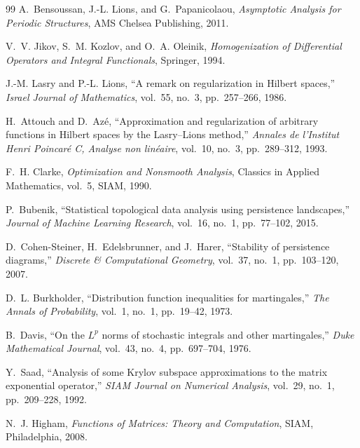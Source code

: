 \documentclass[11pt,a4paper,reqno]{article}
\theoremstyle{definition}
\theoremstyle{remark}
\begin{document}
\begin{thebibliography}{99}
A.~Bensoussan, J.-L. Lions, and G.~Papanicolaou,
\emph{Asymptotic Analysis for Periodic Structures},
AMS Chelsea Publishing, 2011.

V.~V. Jikov, S.~M. Kozlov, and O.~A. Oleinik,
\emph{Homogenization of Differential Operators and Integral Functionals},
Springer, 1994.

J.-M. Lasry and P.-L. Lions,
``A remark on regularization in Hilbert spaces,''
\emph{Israel Journal of Mathematics}, vol.~55, no.~3, pp.~257--266, 1986.

H.~Attouch and D.~Az\'e,
``Approximation and regularization of arbitrary functions in Hilbert spaces by the Lasry--Lions method,''
\emph{Annales de l'Institut Henri Poincar\'e C, Analyse non lin\'eaire}, vol.~10, no.~3, pp.~289--312, 1993.

F.~H. Clarke,
\emph{Optimization and Nonsmooth Analysis},
Classics in Applied Mathematics, vol.~5, SIAM, 1990.

P.~Bubenik,
``Statistical topological data analysis using persistence landscapes,''
\emph{Journal of Machine Learning Research}, vol.~16, no.~1, pp.~77--102, 2015.

D.~Cohen-Steiner, H.~Edelsbrunner, and J.~Harer,
``Stability of persistence diagrams,''
\emph{Discrete \& Computational Geometry}, vol.~37, no.~1, pp.~103--120, 2007.

D.~L. Burkholder,
``Distribution function inequalities for martingales,''
\emph{The Annals of Probability}, vol.~1, no.~1, pp.~19--42, 1973.

B.~Davis,
``On the $L^p$ norms of stochastic integrals and other martingales,''
\emph{Duke Mathematical Journal}, vol.~43, no.~4, pp.~697--704, 1976.

Y.~Saad,
``Analysis of some Krylov subspace approximations to the matrix exponential operator,''
\emph{SIAM Journal on Numerical Analysis}, vol.~29, no.~1, pp.~209--228, 1992.

N.~J. Higham,
\emph{Functions of Matrices: Theory and Computation},
SIAM, Philadelphia, 2008.

\end{thebibliography}
\end{document}
